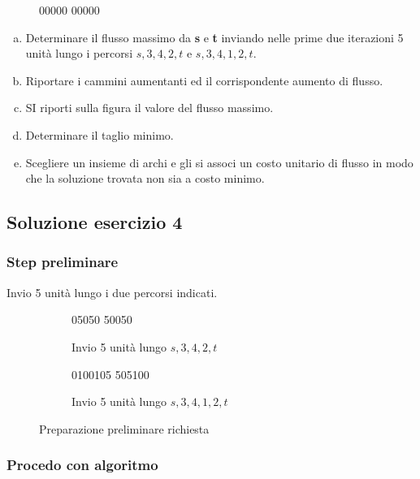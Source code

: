 \documentclass[\main/main.tex]{subfiles}
\begin{document}
\begin{figure}
  \currentGraphPreloader
  {0}{0}{0}{0}{0}
  {0}{0}{0}{0}{0}
  {\blackFlag}{\blackFlag}{\blackFlag}{\blackFlag}{\blackFlag}
  {\blackFlag}{\blackFlag}{\blackFlag}{\blackFlag}{\blackFlag}
\end{figure}

\begin{enumerate}[a)]
  \item Determinare il flusso massimo da \textbf{s} e \textbf{t} inviando nelle prime due iterazioni 5 unità lungo i percorsi $s,3,4,2,t$ e $s,3,4,1,2,t$.
  \item Riportare i cammini aumentanti ed il corrispondente aumento di flusso.
  \item SI riporti sulla figura il valore del flusso massimo.
  \item Determinare il taglio minimo.
  \item Scegliere un insieme di archi e gli si associ un costo unitario di flusso in modo che la soluzione trovata non sia a costo minimo.
\end{enumerate}

\subsection{Soluzione esercizio 4}
\subsubsection*{Step preliminare}
Invio 5 unità lungo i due percorsi indicati.

\begin{figure}
  \begin{subfigure}{0.49\textwidth}
    \currentGraphPreloader
    {0}{5}{0}{5}{0}
    {5}{0}{0}{5}{0}
    {\blackFlag}{\redFlag}{\blackFlag}{\redFlag}{\blackFlag}
    {\redFlag}{\blackFlag}{\blackFlag}{\redFlag}{\blackFlag}
    \caption{Invio 5 unità lungo $s,3,4,2,t$}
  \end{subfigure}
  \begin{subfigure}{0.49\textwidth}
    \currentGraphPreloader
    {0}{10}{0}{10}{5}
    {5}{0}{5}{10}{0}
    {\blackFlag}{\redFlag}{\blackFlag}{\redFlag}{\redFlag}
    {\blackFlag}{\blackFlag}{\redFlag}{\redFlag}{\blackFlag}
    \caption{Invio 5 unità lungo $s,3,4,1,2,t$}
  \end{subfigure}
  \caption{Preparazione preliminare richiesta}
\end{figure}

\subsubsection*{Procedo con algoritmo}
\end{document}
